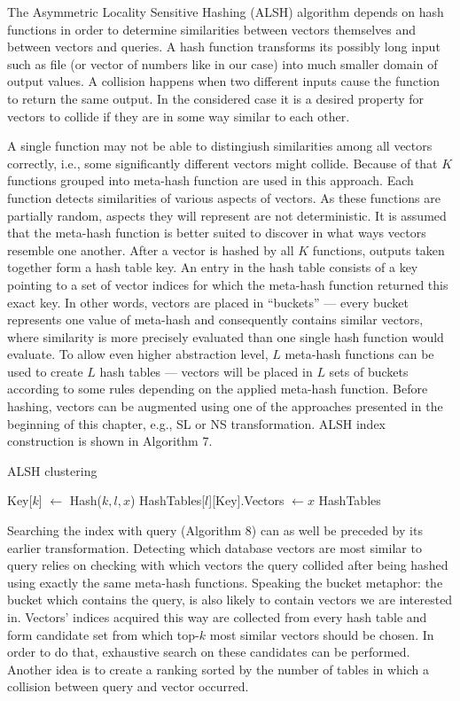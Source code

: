 The Asymmetric Locality Sensitive Hashing (ALSH) \cite{alsh} algorithm depends on hash functions
in order to determine similarities between vectors themselves and between vectors and queries.
A hash function transforms its possibly long input such as file (or vector of numbers like in our case)
into much smaller domain of output values.
A collision happens when two different inputs cause the function to return the same output.
In the considered case it is a desired property for vectors to collide if they are in some way similar to each other.

A single function may not be able to distingiush similarities among all vectors correctly, i.e., some
significantly different vectors might collide. Because of that $K$ functions grouped into
meta-hash function are used in this approach. Each function detects similarities of various aspects of vectors.
As these functions are partially random, aspects they will represent are not deterministic.
It is assumed that the meta-hash function is better suited to discover in what ways vectors
resemble one another.
After a vector is hashed by all $K$ functions, outputs taken together form a hash table key.
An entry in the hash table consists of a key pointing to a set of vector indices for which the meta-hash function
returned this exact key. In other words, vectors are placed in ``buckets'' ---
every bucket represents one value of meta-hash and consequently contains similar vectors, where
similarity is more precisely evaluated than one single hash function would evaluate.
To allow even higher abstraction level, $L$ meta-hash functions can be used to create $L$ hash tables ---
vectors will be placed in $L$ sets of buckets according to some rules depending on the applied meta-hash function.
Before hashing, vectors can be augmented using one of the approaches presented in the beginning
of this chapter, e.g., SL or NS transformation. ALSH index construction is shown in Algorithm 7.

\begin{algorithm}
	\caption{ALSH clustering}
	\begin{algorithmic}
				\State Key[$k$] $\gets$ Hash($k, l, x$)
			\EndFor
			\State HashTables[$l$][Key].Vectors $\gets x$
		\EndFor
		\State \Return HashTables
	\end{algorithmic}
\end{algorithm}

Searching the index with query (Algorithm 8) can as well be preceded by its earlier transformation.
Detecting which database vectors are most similar to query relies on checking with which
vectors the query collided after being hashed using exactly the same meta-hash functions.
Speaking the bucket metaphor: the bucket which contains the query, is also likely to contain
vectors we are interested in.
Vectors' indices acquired this way are collected from every hash table and form candidate set from which top-$k$
most similar vectors should be chosen. In order to do that, exhaustive search on these candidates
can be performed.
Another idea is to create a ranking sorted by the number of tables in which a collision
between query and vector occurred.

